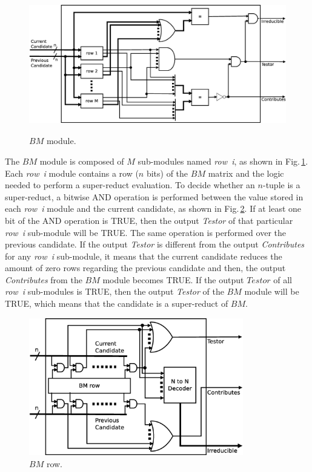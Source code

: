\documentclass[authoryear,preprint,review,12pt]{elsarticle}
\begin{document}
\begin{figure}[htb]
    \begin{center}
        \includegraphics[height=6cm]{BM_module.eps}
    \end{center}
\caption{$BM$ module.}
\label{fig:4}
\end{figure}

The $BM$ module is composed of $M$ sub-modules named \textit{row~i}, as shown
in Fig.\,\ref{fig:4}. Each \textit{row~i} module contains a row ($n$ bits)
of the $BM$ matrix and the logic needed to perform a super-reduct evaluation. To decide
whether an $n$-tuple is a super-reduct, a bitwise AND operation is performed
between the value stored in each \textit{row~i} module and the current
candidate, as shown in Fig.\,\ref{fig:row}. If at least one bit of the AND operation is TRUE,
then the output \textit{Testor} of that particular \textit{row~i} sub-module
will be TRUE. The same operation is performed over the previous candidate.
If the output \textit{Testor} is different from
the output \textit{Contributes} for any \textit{row~i} sub-module,
it means that the current candidate reduces the amount of zero rows regarding the previous candidate and
then, the output \textit{Contributes} from the $BM$ module becomes TRUE.
If the output $Testor$ of all  \textit{row~i} sub-modules is
TRUE, then the output \textit{Testor} of the $BM$ module will be TRUE,
which means that the candidate is a super-reduct of $BM$.


\begin{figure}[htb]
    \begin{center}
        \includegraphics[height=6cm]{BM_row.eps}
    \end{center}
\caption{$BM$ row.}
\label{fig:row}
\end{figure}
\end{document}
